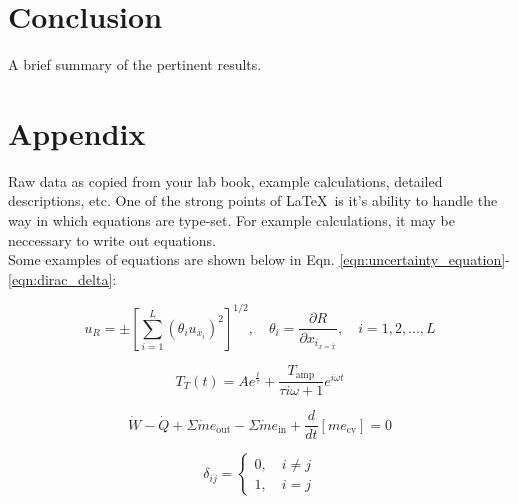 \documentclass[12pt,letterpaper]{article}
\begin{document}
\section{Conclusion}

A brief summary of the pertinent results.

\section{Appendix}

Raw data as copied from your lab book, example calculations, detailed descriptions, etc.  One of the strong points of \LaTeX\ is it's ability to handle the way in which equations are type-set.  For example calculations, it may be neccessary to write out equations.\\ 

Some examples of equations are shown below in Eqn. \ref{eqn:uncertainty_equation}-\ref{eqn:dirac_delta}:

\begin{equation}
	u_R 
	=
	\pm
	\left[
		\sum_{i=1}^{L}
		\left( \theta_i u_{\bar{x}_i} \right)^2
	\right]^{1/2}
	,
	\quad
	\theta_i
	=
	\frac{\partial R}{\partial x_{i_{x=\bar{x}}} },
	\quad
	i=1,2,...,L
	\label{eqn:uncertainty_equation}
\end{equation}

\begin{equation}
	T_T (t)
	=
	A e^{\frac{t}{\tau}}
	+
	\frac{T_{\text{amp}}}{\tau i \omega + 1}
	e^{i\omega t}
\end{equation}

\begin{equation}
	\dot{W}
	-
	\dot{Q}
	+
	\Sigma
	\dot{m} e_{\text{out}}
	-
	\Sigma
	\dot{m} e_{\text{in}}
	+
	\frac{d}{dt}
	\left[ m e_{\text{cv}} \right]
	=
	0
	\label{eqn:energy_equation}
\end{equation}

\begin{equation}
	\delta_{ij}
	=
	\begin{cases}
		0, \quad i \ne j \\ 
		1, \quad i=j
	\end{cases}
	\label{eqn:dirac_delta}
\end{equation}



\end{document}
